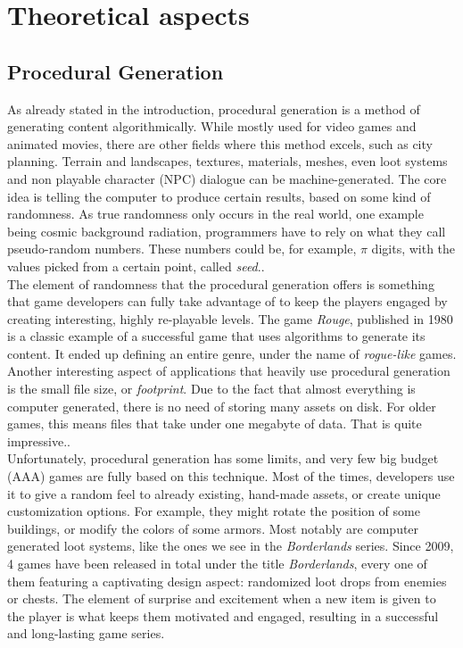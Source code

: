 \chapter{Theoretical aspects}

\pagestyle{fancy}

\label{theoreticalAspects}

\section{Procedural Generation}

As already stated in the introduction, procedural generation is a method of generating content algorithmically. While mostly used for video games and animated movies, there are other fields where this method excels, such as city planning. Terrain and landscapes, textures, materials, meshes, even loot systems and non playable character (NPC) dialogue can be machine-generated. The core idea is telling the computer to produce certain results, based on some kind of randomness. As true randomness only occurs in the real world, one example being cosmic background radiation, programmers have to rely on what they call pseudo-random numbers. These numbers could be, for example, $\pi$ digits, with the values picked from a certain point, called \textit{seed}.\cite{procgenwiki}.\\

The element of randomness that the procedural generation offers is something that game developers can fully take advantage of to keep the players engaged by creating interesting, highly re-playable levels. The game \textit{Rouge}, published in 1980 is a classic example of a successful game that uses algorithms to generate its content. It ended up defining an entire genre, under the name of \textit{rogue-like} games. Another interesting aspect of applications that heavily use procedural generation is the small file size, or \textit{footprint}. Due to the fact that almost everything is computer generated, there is no need of storing many assets on disk. For older games, this means files that take under one megabyte of data. That is quite impressive.\cite{freiknecht2017survey}.\\

Unfortunately, procedural generation has some limits, and very few big budget (AAA) games are fully based on this technique. Most of the times, developers use it to give a random feel to already existing, hand-made assets, or create unique customization options. For example, they might rotate the position of some buildings, or modify the colors of some armors. Most notably are computer generated loot systems, like the ones we see in the \textit{Borderlands} series. Since 2009, 4 games have been released in total under the title \textit{Borderlands}, every one of them featuring a captivating design aspect: randomized loot drops from enemies or chests. The element of surprise and excitement when a new item is given to the player is what keeps them motivated and engaged, resulting in a successful and long-lasting game series\cite{borderlands}.\\

